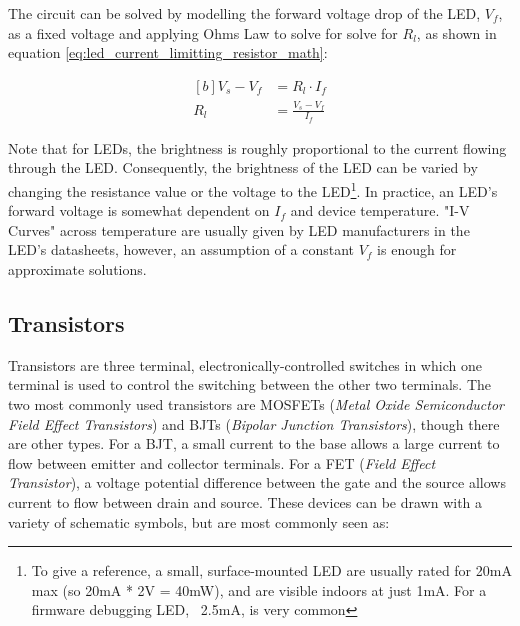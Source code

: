 \documentclass[main.tex]{subfiles}
\begin{document}
\noindent The circuit can be solved by modelling the forward voltage drop of the LED, $V_f$, as a fixed voltage and applying Ohms Law to solve for solve for $R_l$, as shown in equation \eqref{eq:led_current_limitting_resistor_math}:

\begin{equation}
    \begin{aligned}[b]
        V_s - V_f &= R_l \cdot I _f \\
        R_l &= \frac{V_s - V_f}{I_f}
    \end{aligned}
    \label{eq:led_current_limitting_resistor_math}
\end{equation}

\noindent Note that for LEDs, the brightness is roughly proportional to the current flowing through the LED. Consequently, the brightness of the LED can be varied by changing the resistance value or the voltage to the LED\footnote{To give a reference, a small, surface-mounted LED are usually rated for 20mA max (so 20mA * 2V = 40mW), and are visible indoors at just 1mA. For a firmware debugging LED, ~2.5mA, is very common}. In practice, an LED's forward voltage is somewhat dependent on $I_f$ and device temperature. "I-V Curves" across temperature are usually given by LED manufacturers in the LED's datasheets, however, an assumption of a constant $V_f$ is enough for approximate solutions.

\subsection{Transistors}
Transistors are three terminal, electronically-controlled switches in which one terminal is used to control the switching between the other two terminals. The two most commonly used transistors are MOSFETs (\textit{Metal Oxide Semiconductor Field Effect Transistors}) and BJTs (\textit{Bipolar Junction Transistors}), though there are other types. For a BJT, a small current to the base allows a large current to flow between emitter and collector terminals. For a FET (\textit{Field Effect Transistor}), a voltage potential difference between the gate and the source allows current to flow between drain and source. These devices can be drawn with a variety of schematic symbols, but are most commonly seen as:
\end{document}
